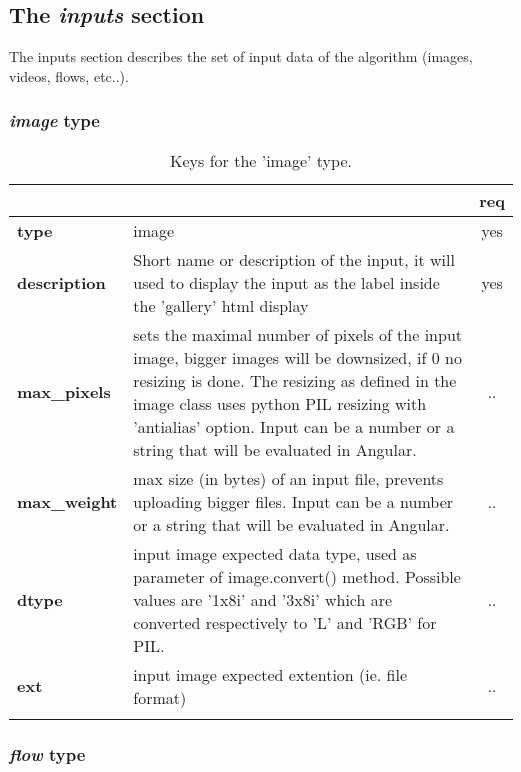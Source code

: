 \subsection{The \emph{inputs} section}
The inputs section describes the set of input data of the algorithm (images, 
videos, flows, etc..).

\subsubsection{\emph{image} type}

\begin{longtable}{|>{\bf}L{\linewidth}|L{\linewidth}|c|}
\hline
{}     &  & {\bf req} \tabularnewline 
\hline \hline
 type         & image & yes \\ \hline
 description  & Short name or description of the input, it will used to display 
the input as the label inside the 'gallery' html display & yes \\ \hline
 max\_pixels   &  sets the maximal number of pixels of the input image, 
bigger images will be downsized, if 0 no resizing is done. The resizing as 
defined in the image class uses python PIL resizing with 'antialias' option. 
Input can be a number or a string that will be evaluated in Angular.  & .. \\ \hline
 max\_weight   & max size (in bytes) of an input file, prevents uploading 
bigger files. Input can be a number or a string that will be evaluated in Angular. & .. \\ \hline
 dtype        & input image expected data type, used as parameter of 
image.convert() method. Possible values are '1x8i' and '3x8i' which are 
converted respectively to 'L' and 'RGB' for PIL. & .. \\ \hline
 ext          & input image expected extention (ie. file format) & .. \\ \hline
\caption{Keys for the 'image' type.}
\end{longtable}

\subsubsection{\emph{flow} type}



